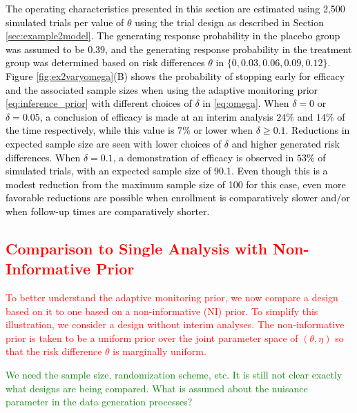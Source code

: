 \documentclass[12pt]{article}
\begin{document}
\textcolor{black}{
The operating characteristics presented in this section are estimated using 2,500 simulated trials per value of $\theta$ using the trial design as described in Section \ref{sec:example2model}. The generating response probability in the placebo group was assumed to be 0.39, and the generating response probability in the treatment group was determined based on risk differences $\theta$ in $\{0, 0.03, 0.06, 0.09, 0.12\}$. Figure \ref{fig:ex2varyomega}(B) shows the probability of stopping early for efficacy and the associated sample sizes when using the adaptive monitoring prior \eqref{eq:inference_prior} with different choices of $\delta$ in \eqref{eq:omega}. When $\delta=0$ or $\delta=0.05$, a conclusion of efficacy is made at an interim analysis $24\%$ and $14\%$ of the time respectively, while this value is $7\%$ or lower when $\delta \geq 0.1$. Reductions in expected sample size are seen with lower choices of $\delta$ and higher generated risk differences. When $\delta=0.1$, a demonstration of efficacy is observed in $53\%$ of simulated trials, with an expected sample size of 90.1. Even though this is a modest reduction from the maximum sample size of 100 for this case, even more favorable reductions are possible when enrollment is comparatively slower and/or when follow-up times are comparatively shorter.}

\textcolor{red}{
\subsection{Comparison to Single Analysis with Non-Informative Prior}\label{sec:non-informative}
To better understand the adaptive monitoring prior, we now compare a design based on it to one based on a non-informative (NI) prior. To simplify this illustration, we consider a design without interim analyses. The non-informative prior is taken to be a uniform prior over the joint parameter space of $(\theta,\eta)$ so that the risk difference $\theta$ is marginally uniform.}
\textcolor{green}{We need the sample size, randomization scheme, etc. It is still not clear exactly what designs are being compared. What is assumed about the nuisance parameter in the data generation processes?}
\end{document}
